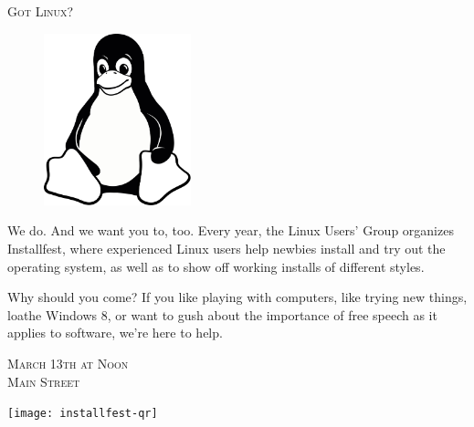\documentclass[10pt]{article}
\begin{document}
\pagestyle{empty}

\begin{center} \LARGE \scshape
    Got Linux?
\end{center}

\begin{figure}
    \vspace{-2em} %
    \begin{center}
        \includegraphics[width=0.38\textwidth]{tux-bw}
    \end{center}
    \vspace{-1em} %
\end{figure}

{\small

We do. And we want you to, too. Every year, the Linux Users' Group organizes
Installfest, where experienced Linux users help newbies install and try out the
operating system, as well as to show off working installs of different styles.

Why should you come? If you like playing with computers, like trying new things,
loathe Windows 8, or want to gush about the importance of free speech as it
applies to software, we're here to help.

}

\vfill

\begin{minipage}[bt]{0.58\textwidth}
    \begin{center}
        {\large \scshape
            March 13th at Noon\\
            Main Street
        }
    \end{center}
\end{minipage}
\begin{minipage}[bt]{0.38\textwidth}
    \begin{center}
        \texttt{[image: installfest-qr]}
    \end{center}
\end{minipage}
\end{document}
